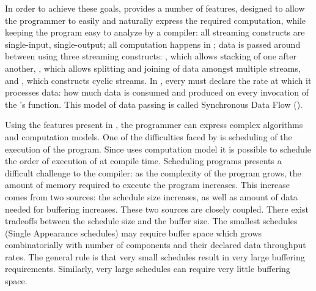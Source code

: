 In order to achieve these goals, {\StreamIt} provides a number of
features, designed to allow the programmer to easily and naturally
express the required computation, while keeping the program easy
to analyze by a compiler: all {\StreamIt} streaming constructs are
single-input, single-output; all computation happens in
{\filters}; data is passed around between {\filters} using three
streaming constructs: {\pipeline}, which allows stacking of
{\filters} one after another, {\splitjoin}, which allows splitting
and joining of data amongst multiple streams, and {{\feedbackloop}},
which constructs cyclic streams.  In {\StreamIt}, every {\filter}
must declare the rate at which it processes data: how much data is
consumed and produced on every invocation of the {\filter}'s
{\work} function.  This model of data passing is called
Synchronous Data Flow ({\SDF}).

\begin{comment}
In addition to {\SDF}, {\StreamIt} allows the programmer to pass
data between {\filters} in an asynchronous manner, similar to a
combination of message passing and function calls. Timing of such
data delivery is expressed in terms of amount of information
wavefronts - the programmer can specify a delay between message
delivery and destination {\filter}'s processing of data currently
being produced or consumed by the source {\filter}.  Such timing
mechanism introduces latency and buffering constraints on
execution of {\StreamIt} programs.
\end{comment}

Using the features present in {\StreamIt}, the programmer can
express complex algorithms and computation models.  One of the
difficulties faced by {\StreamIt} is scheduling of the execution
of the program.  Since {\StreamIt} uses {\SDF} computation model
it is possible to schedule the order of execution of {\filters} at
compile time.  Scheduling {\SDF} programs presents a difficult
challenge to the compiler:  as the complexity of the program
grows, the amount of memory required to execute the program
increases.  This increase comes from two sources: the schedule
size increases, as well as amount of data needed for buffering
increases.  These two sources are closely coupled. There exist
tradeoffs between the schedule size and the buffer size. The
smallest schedules (Single Appearance schedules) may require
buffer space which grows combinatorially with number of components
and their declared data throughput rates. The general rule is that
very small schedules result in very large buffering requirements.
Similarly, very large schedules can require very little buffering
space.

